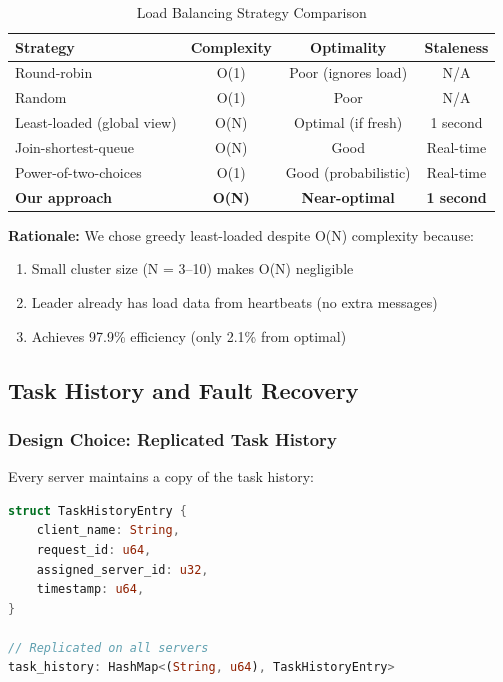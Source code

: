 \documentclass[12pt,a4paper]{article}
\begin{document}
\begin{table}[h]
\centering
\caption{Load Balancing Strategy Comparison}
\label{tab:lb-comparison}
\begin{tabular}{@{}lccc@{}}
\toprule
\textbf{Strategy} & \textbf{Complexity} & \textbf{Optimality} & \textbf{Staleness} \\
\midrule
Round-robin & O(1) & Poor (ignores load) & N/A \\
Random & O(1) & Poor & N/A \\
Least-loaded (global view) & O(N) & Optimal (if fresh) & 1 second \\
Join-shortest-queue & O(N) & Good & Real-time \\
Power-of-two-choices & O(1) & Good (probabilistic) & Real-time \\
\textbf{Our approach} & \textbf{O(N)} & \textbf{Near-optimal} & \textbf{1 second} \\
\bottomrule
\end{tabular}
\end{table}

\textbf{Rationale:} We chose greedy least-loaded despite O(N) complexity because:
\begin{enumerate}
    \item Small cluster size (N = 3--10) makes O(N) negligible
    \item Leader already has load data from heartbeats (no extra messages)
    \item Achieves 97.9\% efficiency (only 2.1\% from optimal)
\end{enumerate}

\subsection{Task History and Fault Recovery}

\subsubsection{Design Choice: Replicated Task History}

Every server maintains a copy of the task history:

\begin{lstlisting}[language=Rust,caption={Task History Data Structure},label=lst:history]
struct TaskHistoryEntry {
    client_name: String,
    request_id: u64,
    assigned_server_id: u32,
    timestamp: u64,
}

// Replicated on all servers
task_history: HashMap<(String, u64), TaskHistoryEntry>
\end{lstlisting}
\end{document}
